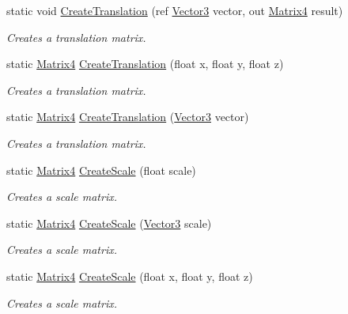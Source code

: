 \begin{DoxyCompactItemize}
static void \hyperlink{struct_open_t_k_1_1_matrix4_a72d99fa97940c82a7eaf08915f728aff}{Create\-Translation} (ref \hyperlink{struct_open_t_k_1_1_vector3}{Vector3} vector, out \hyperlink{struct_open_t_k_1_1_matrix4}{Matrix4} result)
\begin{DoxyCompactList}\small\item\em Creates a translation matrix. \end{DoxyCompactList}\item 
static \hyperlink{struct_open_t_k_1_1_matrix4}{Matrix4} \hyperlink{struct_open_t_k_1_1_matrix4_a5dcdcb49c17295ad658eef1e57cc7127}{Create\-Translation} (float x, float y, float z)
\begin{DoxyCompactList}\small\item\em Creates a translation matrix. \end{DoxyCompactList}\item 
static \hyperlink{struct_open_t_k_1_1_matrix4}{Matrix4} \hyperlink{struct_open_t_k_1_1_matrix4_a4244bc21b239d97d94d330c4745ef8f7}{Create\-Translation} (\hyperlink{struct_open_t_k_1_1_vector3}{Vector3} vector)
\begin{DoxyCompactList}\small\item\em Creates a translation matrix. \end{DoxyCompactList}\item 
static \hyperlink{struct_open_t_k_1_1_matrix4}{Matrix4} \hyperlink{struct_open_t_k_1_1_matrix4_a59c3798f8d7be02760823573578348c9}{Create\-Scale} (float scale)
\begin{DoxyCompactList}\small\item\em Creates a scale matrix. \end{DoxyCompactList}\item 
static \hyperlink{struct_open_t_k_1_1_matrix4}{Matrix4} \hyperlink{struct_open_t_k_1_1_matrix4_a43e525a66387c705344e4ee45947a08d}{Create\-Scale} (\hyperlink{struct_open_t_k_1_1_vector3}{Vector3} scale)
\begin{DoxyCompactList}\small\item\em Creates a scale matrix. \end{DoxyCompactList}\item 
static \hyperlink{struct_open_t_k_1_1_matrix4}{Matrix4} \hyperlink{struct_open_t_k_1_1_matrix4_a6004e281fa3b7247f510fc9047196861}{Create\-Scale} (float x, float y, float z)
\begin{DoxyCompactList}\small\item\em Creates a scale matrix. \end{DoxyCompactList}\item 

\end{DoxyCompactItemize}
